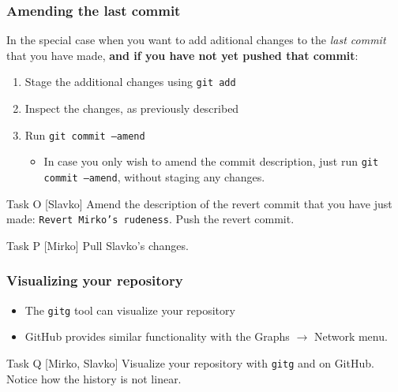 
\begin{frame}[fragile]

\frametitle{Amending the last commit}

In the special case when you want to add aditional changes to the \textit{last commit} that you have made, \textbf{and if you have not yet pushed that commit}:

	\begin{enumerate}
	\item Stage the additional changes using \texttt{git add}
	\item Inspect the changes, as previously described
	\item Run \texttt{git commit --amend}
	\begin{itemize}
	\item In case you only wish to amend the commit description, just run \texttt{git commit --amend}, without staging any changes.
	\end{itemize}
	\end{enumerate}

	\begin{block}{Task O [Slavko]}
	Amend the description of the revert commit that you have just made: \texttt{Revert Mirko's rudeness}. Push the revert commit.

\end{block}

	\begin{block}{Task P [Mirko]}
	Pull Slavko's changes.	
	\end{block}


\end{frame}



\begin{frame}

\frametitle{Visualizing your repository}

\begin{itemize}
	\item The \texttt{gitg} tool can visualize your repository
	\item GitHub provides similar functionality with the Graphs $\rightarrow$ Network menu.
\end{itemize}

\begin{block}{Task Q [Mirko, Slavko]}
	Visualize your repository with \texttt{gitg} and on GitHub. Notice how the history is not linear. 
\end{block}

\end{frame}

